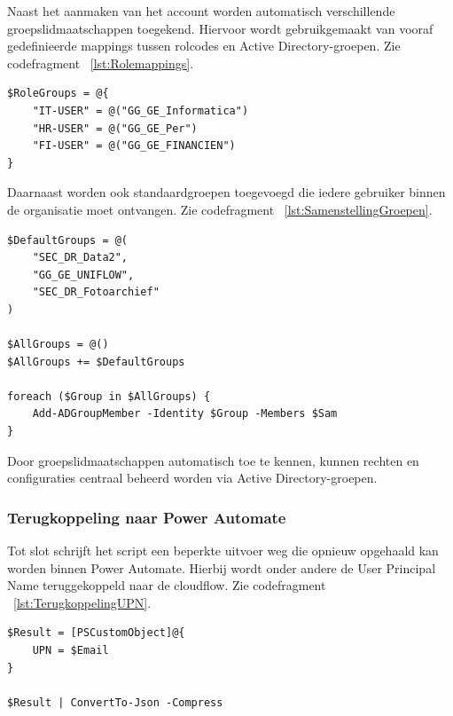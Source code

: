 Naast het aanmaken van het account worden automatisch verschillende groepslidmaatschappen toegekend. Hiervoor wordt gebruikgemaakt van vooraf gedefinieerde mappings tussen rolcodes en Active Directory-groepen. Zie codefragment ~\ref{lst:Rolemappings}.

\begin{listing}[ht]
\begin{verbatim}
$RoleGroups = @{
    "IT-USER" = @("GG_GE_Informatica")
    "HR-USER" = @("GG_GE_Per")
    "FI-USER" = @("GG_GE_FINANCIEN")
}
\end{verbatim}
\caption{Samenstelling rollen}
\label{lst:Rolemappings}
\end{listing}

Daarnaast worden ook standaardgroepen toegevoegd die iedere gebruiker binnen de organisatie moet ontvangen. Zie codefragment ~\ref{lst:SamenstellingGroepen}.

\begin{listing}[ht]
\begin{verbatim}
$DefaultGroups = @(
    "SEC_DR_Data2",
    "GG_GE_UNIFLOW",
    "SEC_DR_Fotoarchief"
)

$AllGroups = @()
$AllGroups += $DefaultGroups

foreach ($Group in $AllGroups) {
    Add-ADGroupMember -Identity $Group -Members $Sam
}
\end{verbatim}
\caption{Samenstelling groepen}
\label{lst:SamenstellingGroepen}
\end{listing}

Door groepslidmaatschappen automatisch toe te kennen, kunnen rechten en configuraties centraal beheerd worden via Active Directory-groepen.

\subsubsection{Terugkoppeling naar Power Automate}

Tot slot schrijft het script een beperkte uitvoer weg die opnieuw opgehaald kan worden binnen Power Automate. Hierbij wordt onder andere de User Principal Name teruggekoppeld naar de cloudflow. Zie codefragment ~\ref{lst:TerugkoppelingUPN}.

\begin{listing}[ht]
\begin{verbatim}
$Result = [PSCustomObject]@{
    UPN = $Email
}

$Result | ConvertTo-Json -Compress
\end{verbatim}
\caption{Terugkoppeling UPN}
\label{lst:TerugkoppelingUPN}
\end{listing}

